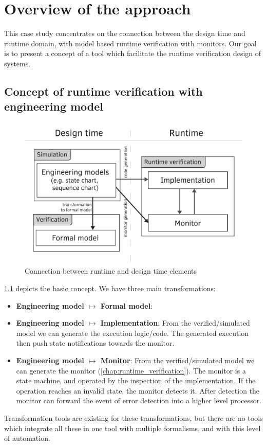 \chapter{Overview of the approach}
\label{chap:overview}

This case study concentrates on the connection between the design time and runtime domain, with model based runtime verification with monitors. Our goal is to present a concept of a tool which facilitate the runtime verification design of systems.

\section{Concept of runtime verification with engineering model}

\begin{figure}[h]
	\centering
	\includegraphics[width=0.6\linewidth]{include/figures/chapter_3/abstract_overview}
	\caption{Connection between runtime and design time elements}
	\label{fig:overview:abstract_overview}
\end{figure}

\cref{fig:overview:abstract_overview} depicts the basic concept. We have three main transformations:
\begin{itemize}
	\item \textbf{Engineering model $\mapsto$ Formal model}: 
	\item \textbf{Engineering model $\mapsto$ Implementation}: From the verified/simulated model we can generate the execution logic/code. The generated execution then push state notifications towards the monitor.
	\item \textbf{Engineering model $\mapsto$ Monitor}: From the verified/simulated model we can generate the monitor (\vref{chap:runtime_verification}). The monitor is a state machine, and operated by the inspection of the implementation. If the operation reaches an invalid state, the monitor detects it. After detection the monitor can forward the event of error detection into a higher level processor.
\end{itemize}
Transformation tools are existing for these transformations, but there are no tools which integrate all these in one tool with multiple formalisms, and with this level of automation.
\\[1ex]

